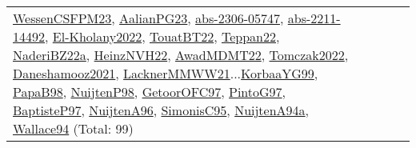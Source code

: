 {\begin{longtable}{p{3cm}r>{\raggedright\arraybackslash}p{6cm}>{\raggedright\arraybackslash}p{6cm}>{\raggedright\arraybackslash}p{8cm}}
\hyperref[detail:WessenCSFPM23]{WessenCSFPM23}, \hyperref[detail:AalianPG23]{AalianPG23}, \hyperref[detail:abs-2306-05747]{abs-2306-05747}, \hyperref[detail:abs-2211-14492]{abs-2211-14492}, \hyperref[detail:El-Kholany2022]{El-Kholany2022}, \hyperref[detail:TouatBT22]{TouatBT22}, \hyperref[detail:Teppan22]{Teppan22}, \hyperref[detail:NaderiBZ22a]{NaderiBZ22a}, \hyperref[detail:HeinzNVH22]{HeinzNVH22}, \hyperref[detail:AwadMDMT22]{AwadMDMT22}, \hyperref[detail:Tomczak2022]{Tomczak2022}, \hyperref[detail:Daneshamooz2021]{Daneshamooz2021}, \hyperref[detail:LacknerMMWW21]{LacknerMMWW21}...\hyperref[detail:KorbaaYG99]{KorbaaYG99}, \hyperref[detail:PapaB98]{PapaB98}, \hyperref[detail:NuijtenP98]{NuijtenP98}, \hyperref[detail:GetoorOFC97]{GetoorOFC97}, \hyperref[detail:PintoG97]{PintoG97}, \hyperref[detail:BaptisteP97]{BaptisteP97}, \hyperref[detail:NuijtenA96]{NuijtenA96}, \hyperref[detail:SimonisC95]{SimonisC95}, \hyperref[detail:NuijtenA94a]{NuijtenA94a}, \hyperref[detail:Wallace94]{Wallace94} (Total: 99)\\

\end{longtable}}
